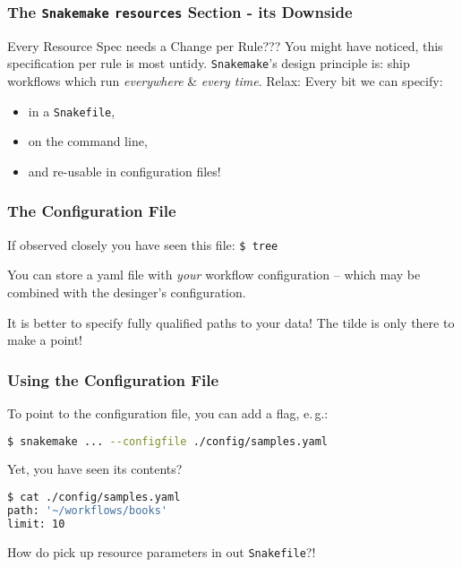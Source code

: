 \begin{frame}
  \frametitle{The \texttt{Snakemake} \texttt{resources} Section - its Downside}
  \begin{alertblock}{Every Resource Spec needs a Change per Rule???}
   You might have noticed, this specification per rule is most untidy. \texttt{Snakemake}'s design principle is: ship workflows which run \emph{everywhere} \& \emph{every time}.
   \newline \pause
   Relax: Every bit we can specify:
   \begin{itemize}
    \item in a \texttt{Snakefile},
    \item on the command line,
    \item and re-usable in configuration files!
   \end{itemize}

  \end{alertblock}

\end{frame} 

\begin{frame}
  \frametitle{The Configuration File}
  If observed closely you have seen this file:\newline
            {\tiny \DTsetlength{0.2em}{1em}{0.2em}{0.4pt}{.6pt}
\texttt{\$ tree}
}
 \pause
 \begin{docs}
 	You can store a yaml file with \emph{your} workflow configuration -- which may be combined with the desinger's configuration.
 \end{docs}
 \pause
 \begin{warning}
 	It is better to specify fully qualified paths to your data! The tilde is only there to make a point!
 \end{warning}
\end{frame}

\begin{frame}[fragile]
  \frametitle{Using the Configuration File}
  To point to the configuration file, you can add a flag, e.\,g.:
  \begin{lstlisting}[language=Bash, style=Shell]
$ snakemake ... --configfile ./config/samples.yaml  
  \end{lstlisting}
  Yet, you have seen its contents?
  \begin{lstlisting}[language=Bash, style=Shell]
$ cat ./config/samples.yaml
path: '~/workflows/books'
limit: 10
  \end{lstlisting}
  \begin{question}
  	How do pick up resource parameters in out \texttt{Snakefile}?!
  \end{question}
\end{frame} 

